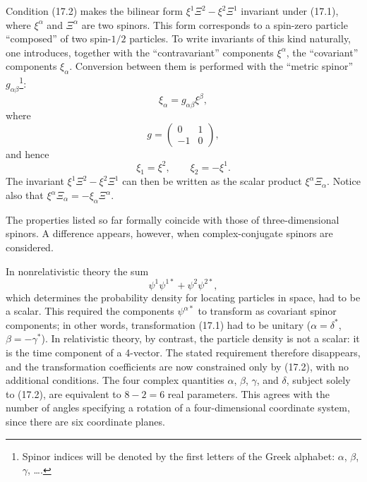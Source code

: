 Condition (17.2) makes the bilinear form $\xi^1\Xi^2-\xi^2\Xi^1$ invariant under (17.1), where $\xi^\alpha$ and $\Xi^\alpha$ are two spinors. This form corresponds to a spin-zero particle ``composed'' of two spin-$1/2$ particles. To write invariants of this kind naturally, one introduces, together with the ``contravariant'' components $\xi^\alpha$, the ``covariant'' components $\xi_\alpha$. Conversion between them is performed with the ``metric spinor'' $g_{\alpha\beta}$\footnote{Spinor indices will be denoted by the first letters of the Greek alphabet: $\alpha$, $\beta$, $\gamma$, \ldots.}:
\begin{equation}
\xi_\alpha=g_{\alpha\beta}\xi^\beta,
\tag{17.3}
\end{equation}
where
\begin{equation}
g=\begin{pmatrix}0&1\\-1&0\end{pmatrix},
\tag{17.4}
\end{equation}
and hence
\begin{equation}
\xi_1=\xi^2,\qquad \xi_2=-\xi^1.
\tag{17.5}
\end{equation}
The invariant $\xi^1\Xi^2-\xi^2\Xi^1$ can then be written as the scalar product $\xi^\alpha\Xi_\alpha$. Notice also that $\xi^\alpha\Xi_\alpha=-\xi_\alpha\Xi^\alpha$.

The properties listed so far formally coincide with those of three-dimensional spinors. A difference appears, however, when complex-conjugate spinors are considered.

In nonrelativistic theory the sum
\begin{equation}
\psi^1\psi^{1*}+\psi^2\psi^{2*},
\tag{17.6}
\end{equation}
which determines the probability density for locating particles in space, had to be a scalar. This required the components $\psi^{\alpha*}$ to transform as covariant spinor components; in other words, transformation (17.1) had to be unitary ($\alpha=\delta^*$, $\beta=-\gamma^*$). In relativistic theory, by contrast, the particle density is not a scalar: it is the time component of a 4-vector. The stated requirement therefore disappears, and the transformation coefficients are now constrained only by (17.2), with no additional conditions. The four complex quantities $\alpha$, $\beta$, $\gamma$, and $\delta$, subject solely to (17.2), are equivalent to $8-2=6$ real parameters. This agrees with the number of angles specifying a rotation of a four-dimensional coordinate system, since there are six coordinate planes.

